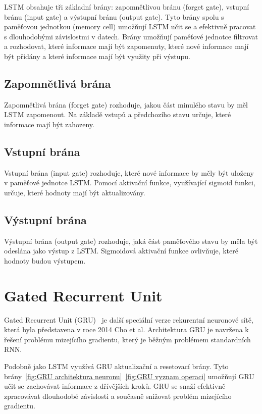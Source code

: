 LSTM obsahuje tři základní brány: zapomnětlivou bránu (forget gate), vstupní bránu (input gate) a výstupní bránu (output gate).
Tyto brány spolu s paměťovou jednotkou (memory cell) umožňují LSTM učit se a efektivně pracovat s dlouhodobými závislostmi v datech.
Brány umožňují paměťové jednotce filtrovat a rozhodovat, které informace mají být zapomenuty, které nové informace mají být přidány a které informace mají být využity při výstupu.

\subsection{Zapomnětlivá brána}
Zapomnětlivá brána (forget gate) rozhoduje, jakou část minulého stavu by měl LSTM zapomenout. Na základě vstupů a předchozího stavu určuje, které informace mají být zahozeny.

\subsection{Vstupní brána}
Vstupní brána (input gate) rozhoduje, které nové informace by měly být uloženy v paměťové jednotce LSTM.\@
Pomocí aktivační funkce, využívající sigmoid funkci, určuje, které hodnoty mají být aktualizovány.

\subsection{Výstupní brána}
Výstupní brána (output gate) rozhoduje, jaká část paměťového stavu by měla být odeslána jako výstup z LSTM.\@
Sigmoidová aktivační funkce ovlivňuje, které hodnoty budou výstupem.

\section{Gated Recurrent Unit}
Gated Recurrent Unit (GRU)~\cite{link4} je další speciální verze rekurentní neuronové sítě, která byla představena v roce 2014 Cho et al.
Architektura GRU je navržena k řešení problému mizejícího gradientu, který je běžným problémem standardních RNN.\@

Podobně jako LSTM využívá GRU aktualizační a resetovací brány.
Tyto brány~\ref{fig:GRU architektura neuronu}~\ref{fig:GRU vyznam operaci} umožňují GRU učit se zachovávat informace z dřívějších kroků.
GRU se snaží efektivně zpracovávat dlouhodobé závislosti a současně snižovat problém mizejícího gradientu.

